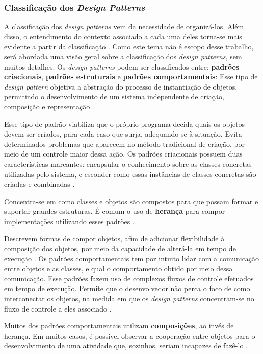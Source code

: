\subsubsection{Classificação dos \textit{Design Patterns}}
A classificação dos \textit{design patterns} vem da necessidade de organizá-los. Além disso, o entendimento do contexto associado a cada uma deles torna-se mais evidente a partir da classificação \cite{gammaEtAl1994}. Como este tema não é escopo desse trabalho, será abordada uma visão geral sobre a classificação dos \textit{design patterns}, sem muitos detalhes. Os \textit{design patterns} podem ser classificados entre: \textbf{padrões criacionais}, \textbf{padrões estruturais} e \textbf{padrões comportamentais}:
Esse tipo de \textit{design pattern} objetiva a abstração do processo de instantiação de objetos, permitindo o desenvolvimento de um sistema independente de criação, composição e representação \cite{gammaEtAl1994}.
\par
\indent Esse tipo de padrão viabiliza que o próprio programa decida quais os objetos devem ser criados, para cada caso que surja, adequando-se à situação. Evita determinados problemas que aparecem no método tradicional de criação, por meio de um controle maior dessa ação. Os padrões criacionais possuem duas características marcantes: encapsular o conhecimento sobre as classes concretas utilizadas pelo sistema, e esconder como essas instâncias de classes concretas são criadas e combinadas \cite{gammaEtAl1994}.
\par
\indent Concentra-se em como classes e objetos são compostos para que possam formar e suportar grandes estruturas. É comum o uso de \textbf{herança} para compor implementações utilizando esses padrões \cite{gammaEtAl1994}.
\par
\indent Descrevem formas de compor objetos, afim de adicionar flexibilidade à composição dos objetos, por meio da capacidade de alterá-la em tempo de execução \cite{gammaEtAl1994}.
Os padrões comportamentais tem por intuito lidar com a comunicação entre objetos e as classes, e qual o comportamento obtido por meio dessa comunicação. Esse padrões fazem uso de complexos fluxos de controle efetuados em tempo de execução. Permite que o desenvolvedor não perca o foco de como interconectar os objetos, na medida em que os \textit{design patterns} concentram-se no fluxo de controle a eles associado \cite{gammaEtAl1994}.
\par
\indent Muitos dos padrões comportamentais utilizam \textbf{composições}, ao invés de herança. Em muitos casos, é possível observar a cooperação entre objetos para o desenvolvimento de uma atividade que, sozinhos, seriam incapazes de fazê-lo \cite{gammaEtAl1994}.


